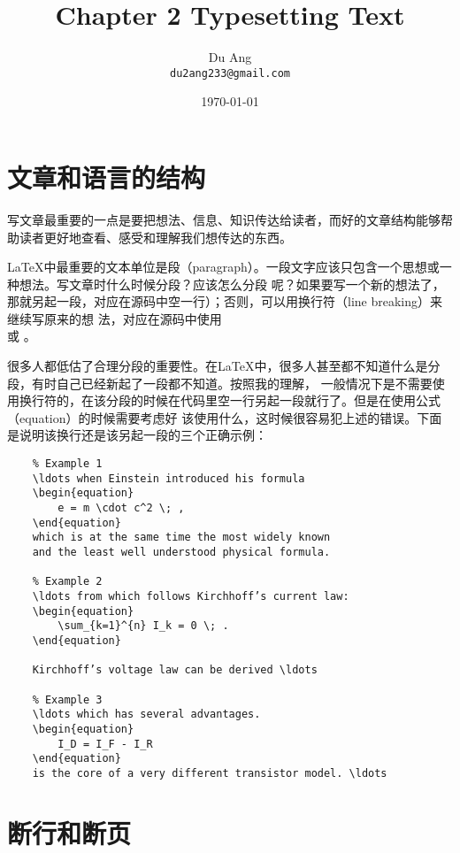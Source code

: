\documentclass[UTF8]{ctexart}
\title{\heiti Chapter 2 Typesetting Text}
\author{\kaishu Du Ang \\ \texttt{du2ang233@gmail.com} }
\date{\today}
\begin{document}
\maketitle

\tableofcontents

\newpage
\section{文章和语言的结构}
写文章最重要的一点是要把想法、信息、知识传达给读者，而好的文章结构能够帮助读者更好地查看、感受和理解我们想传达的东西。

\LaTeX 中最重要的文本单位是段（paragraph）。一段文字应该只包含一个思想或一种想法。写文章时什么时候分段？应该怎么分段
呢？如果要写一个新的想法了，那就另起一段，对应在源码中空一行）；否则，可以用换行符（line breaking）来继续写原来的想
法，对应在源码中使用 \texttt{\\} 或 \texttt{\newline}。

很多人都低估了合理分段的重要性。在\LaTeX 中，很多人甚至都不知道什么是分段，有时自己已经新起了一段都不知道。按照我的理解，
一般情况下是不需要使用换行符的，在该分段的时候在代码里空一行另起一段就行了。但是在使用公式（equation）的时候需要考虑好
该使用什么，这时候很容易犯上述的错误。下面是说明该换行还是该另起一段的三个正确示例：
\begin{verbatim}
    % Example 1
    \ldots when Einstein introduced his formula
    \begin{equation}
        e = m \cdot c^2 \; ,
    \end{equation}
    which is at the same time the most widely known
    and the least well understood physical formula.

    % Example 2
    \ldots from which follows Kirchhoff’s current law:
    \begin{equation}
        \sum_{k=1}^{n} I_k = 0 \; .
    \end{equation}

    Kirchhoff’s voltage law can be derived \ldots

    % Example 3
    \ldots which has several advantages.
    \begin{equation}
        I_D = I_F - I_R
    \end{equation}
    is the core of a very different transistor model. \ldots
\end{verbatim}

\section{断行和断页}
\end{document}
